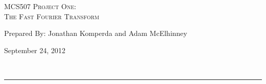 \begin{center}
\textsc{\Large MCS507 Project One:\\}
\textsc{The Fast Fourier Transform}
\end{center}
\begin{minipage}{0.4\textwidth}
\begin{flushleft}
	Prepared By: Jonathan Komperda and Adam McElhinney
\end{flushleft}
\end{minipage}
\begin{minipage}{0.59\textwidth}
\begin{flushright}
	September 24, 2012
\end{flushright}
\end{minipage}\\[0.01in]
\hrule